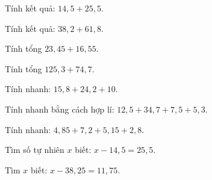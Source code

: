 
\begin{ex}
  Tính kết quả: $14{,}5 + 25{,}5$.
\end{ex}

\begin{ex}
  Tính kết quả: $38{,}2 + 61{,}8$.
\end{ex}

\begin{ex}
  Tính tổng $23{,}45 + 16{,}55$.
\end{ex}

\begin{ex}
  Tính tổng $125{,}3 + 74{,}7$.
\end{ex}

\begin{ex}
  Tính nhanh: $15{,}8 + 24{,}2 + 10$.
\end{ex}

\begin{ex}
  Tính nhanh bằng cách hợp lí: $12{,}5 + 34{,}7 + 7{,}5 + 5{,}3$.
\end{ex}

\begin{ex}
  Tính nhanh: $4{,}85 + 7{,}2 + 5{,}15 + 2{,}8$.
\end{ex}

\begin{ex}
  Tìm số tự nhiên $x$ biết: $x - 14{,}5 = 25{,}5$.
\end{ex}

\begin{ex}
  Tìm $x$ biết: $x - 38{,}25 = 11{,}75$.
\end{ex}

